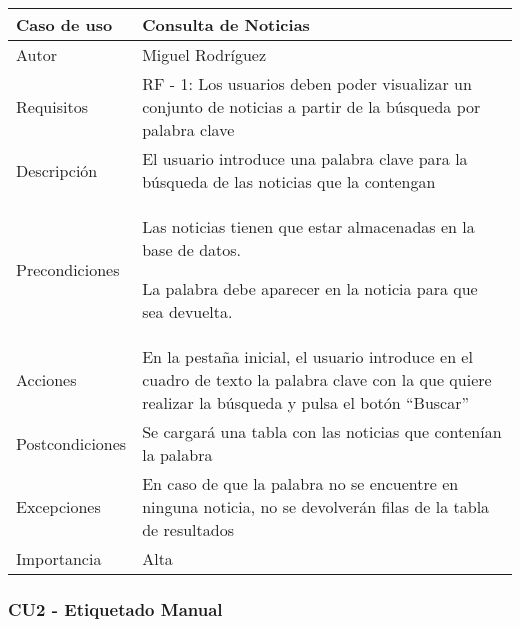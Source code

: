 \begin{center}
\begin{tabular}{ | m{3cm} | m{10cm}| } 
\hline
Caso de uso & Consulta de Noticias \\ 
\hline
Autor & Miguel Rodríguez \\ 
\hline
Requisitos & RF - 1: Los usuarios deben poder visualizar un conjunto de noticias a partir de la búsqueda por palabra clave \\ 
\hline
Descripción & El usuario introduce una palabra clave para la búsqueda de las noticias que la contengan \\
\hline
Precondiciones & Las noticias tienen que estar almacenadas en la base de datos. 

La palabra debe aparecer en la noticia para que sea devuelta. \\
\hline
Acciones & En la pestaña inicial, el usuario introduce en el cuadro de texto la palabra clave con la que quiere realizar la búsqueda y pulsa el botón ``Buscar'' \\
\hline
Postcondiciones & Se cargará una tabla con las noticias que contenían la palabra \\
\hline
Excepciones & En caso de que la palabra no se encuentre en ninguna noticia, no se devolverán filas de la tabla de resultados \\
\hline 
Importancia & Alta \\
\hline 
\end{tabular}
\end{center}

\subsubsection{CU2 - Etiquetado Manual}

